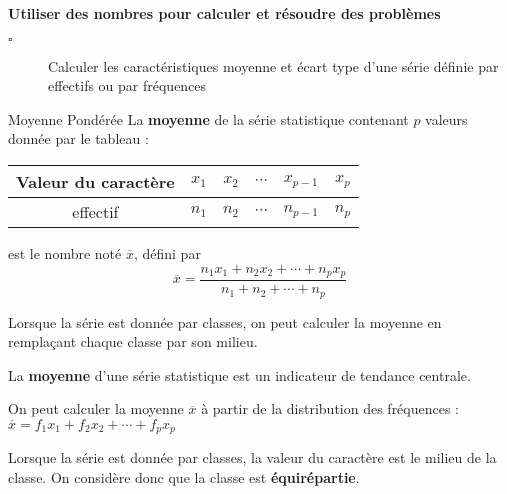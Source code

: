 \begin{titre}

\end{titre}


\begin{CpsCol}
\textbf{Utiliser des nombres pour calculer et résoudre des problèmes}
\begin{description}
\item[$\square$] Calculer les caractéristiques moyenne et écart type d'une série définie par effectifs ou par fréquences
\end{description}
\end{CpsCol}



\begin{DefT}{Moyenne Pondérée}
La \textbf{moyenne} de la série statistique contenant $p$ valeurs donnée par le tableau :

\begin{tabular}{|c|c|c|c|c|c|}
\hline 
Valeur du caractère & $x_1$ & $x_2$ & $\cdots$ & $x_{p-1}$ & $x_p$ \\ 
\hline 
effectif & $n_1$ & $n_2$ & $\cdots$ & $n_{p-1}$ & $n_p$ \\ 
\hline 
\end{tabular} 

est le nombre noté $\overline{x}$, défini par  $$\overline{x}= \frac{n_1x_1+n_2x_2+\cdots+n_px_p}{n_1+n_2+\cdots+n_p}$$

Lorsque la série est donnée par classes, on peut calculer la moyenne en remplaçant chaque classe par son
milieu.

 La \textbf{moyenne} d'une série statistique est un indicateur de tendance centrale.
\end{DefT}



\begin{Th}
On peut calculer la moyenne $\overline{x}$ à partir de la distribution des fréquences :  $\overline{x} = f_1 x_1+ f_2 x_2+\cdots+f_p x_p$
\end{Th}


\begin{minipage}{0.48\linewidth}


\begin{Rq}
Lorsque la série est donnée par classes, la valeur du caractère est le milieu de la classe. On considère donc que la classe est \textbf{équirépartie}.
\end{Rq}
\end{minipage}
\hfill
\begin{minipage}{0.48\linewidth}



\end{minipage}

